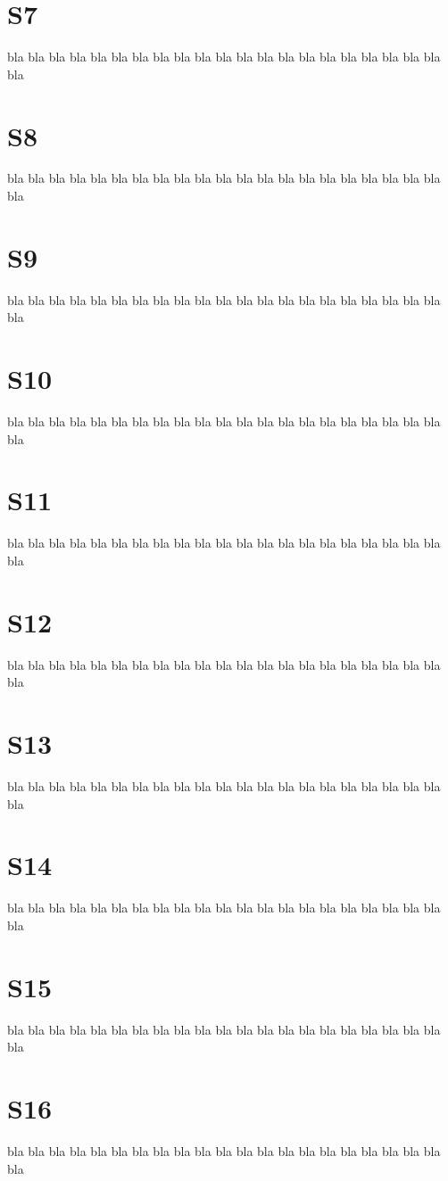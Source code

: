 \documentclass[12pt,a4paper]{report} %
\begin{document}
\section{S7}
bla bla bla bla bla bla bla bla bla bla bla
bla bla bla bla bla bla bla bla bla bla bla
\section{S8}
bla bla bla bla bla bla bla bla bla bla bla
bla bla bla bla bla bla bla bla bla bla bla
\section{S9}
bla bla bla bla bla bla bla bla bla bla bla
bla bla bla bla bla bla bla bla bla bla bla
\section{S10}
bla bla bla bla bla bla bla bla bla bla bla
bla bla bla bla bla bla bla bla bla bla bla
\section{S11}
bla bla bla bla bla bla bla bla bla bla bla
bla bla bla bla bla bla bla bla bla bla bla
\section{S12}
bla bla bla bla bla bla bla bla bla bla bla
bla bla bla bla bla bla bla bla bla bla bla
\section{S13}
bla bla bla bla bla bla bla bla bla bla bla
bla bla bla bla bla bla bla bla bla bla bla
\section{S14}
bla bla bla bla bla bla bla bla bla bla bla
bla bla bla bla bla bla bla bla bla bla bla
\section{S15}
bla bla bla bla bla bla bla bla bla bla bla
bla bla bla bla bla bla bla bla bla bla bla
\section{S16}
bla bla bla bla bla bla bla bla bla bla bla
bla bla bla bla bla bla bla bla bla bla bla
\end{document}
